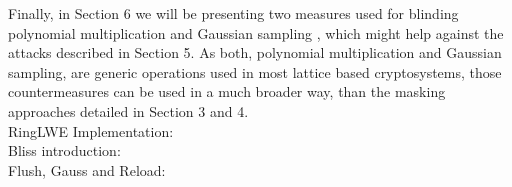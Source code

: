 
Finally, in Section 6 we will be presenting two measures used for blinding polynomial multiplication and Gaussian sampling \cite{cryptoeprint:2016:276}, which might help against the attacks described in Section 5. As both, polynomial multiplication and Gaussian sampling, are generic operations used in most lattice based cryptosystems, those countermeasures can be used in a much broader way, than the masking approaches detailed in Section 3 and 4.\\

RingLWE Implementation: \cite{Pöppelmann2014} \\
Bliss introduction: \cite{cryptoeprint:2013:383} \\
Flush, Gauss and Reload: \cite{cryptoeprint:2016:300} \\
